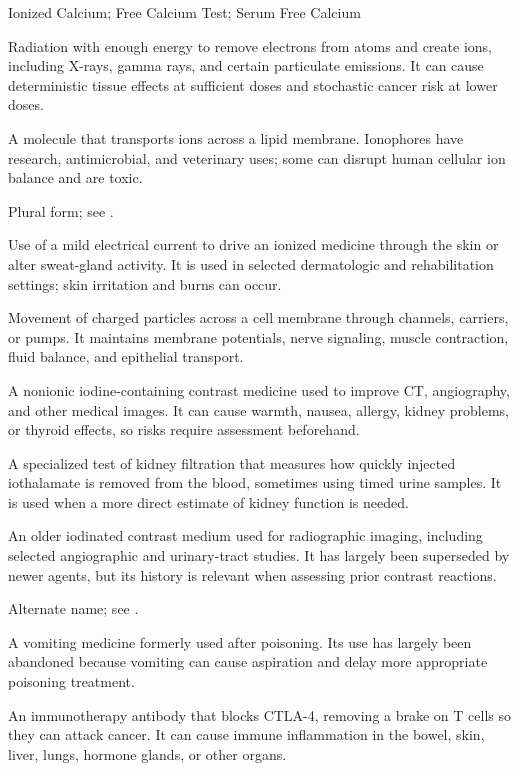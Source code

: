 \synonyms
Ionized Calcium; Free Calcium Test; Serum Free Calcium

 Radiation with enough energy to remove electrons from atoms and create ions, including
X-rays, gamma rays, and certain particulate emissions. It can cause deterministic tissue
effects at sufficient doses and stochastic cancer risk at lower doses.

 A molecule that transports ions across a lipid membrane. Ionophores have research, antimicrobial, and veterinary uses; some can disrupt human cellular ion balance and are toxic.

 Plural form; see .

 Use of a mild electrical current to drive an ionized medicine through the skin or alter sweat-gland activity. It is used in selected dermatologic and rehabilitation settings; skin irritation and burns can occur.

 Movement of charged particles across a cell membrane through channels, carriers, or pumps. It maintains membrane potentials, nerve signaling, muscle contraction, fluid balance, and epithelial transport.

 A nonionic iodine-containing contrast medicine used to improve CT, angiography, and other medical images. It can cause warmth, nausea, allergy, kidney problems, or thyroid effects, so risks require assessment beforehand.

 A specialized test of kidney filtration that measures how quickly injected iothalamate is removed from the blood, sometimes using timed urine samples. It is used when a more direct estimate of kidney function is needed.

 An older iodinated contrast medium used for radiographic imaging, including selected angiographic and urinary-tract studies. It has largely been superseded by newer agents, but its history is relevant when assessing prior contrast reactions.

 Alternate name; see .

 A vomiting medicine formerly used after poisoning. Its use has largely been abandoned because vomiting can cause aspiration and delay more appropriate poisoning treatment.

 An immunotherapy antibody that blocks CTLA-4, removing a brake on T cells so they can attack cancer. It can cause immune inflammation in the bowel, skin, liver, lungs, hormone glands, or other organs.

